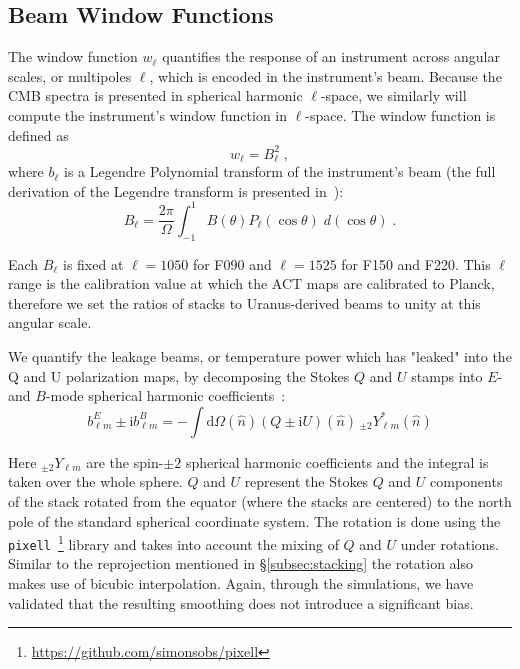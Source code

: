 \subsection{Beam Window Functions}
\label{subsec:window}

The window function $w_{\ell}$ quantifies the response of an instrument across angular scales, or multipoles $\ell$, which is encoded in the instrument's beam.  Because the CMB spectra is presented in spherical harmonic $\ell$-space, we similarly will compute the instrument's window function in $\ell$-space.  The window function is defined as
\begin{equation}
    w_\ell = B_\ell^2 \; ,
\end{equation}
where $b_\ell$ is a Legendre Polynomial transform of the instrument's beam (the full derivation of the Legendre transform is presented in~\cite{Lungu_2022}): 
\begin{equation}
B_{\ell} = \frac{2\pi}{\Omega}\int_{-1}^{1} B(\theta)P_{\ell}(\cos\theta)\; d(\cos\theta) \; .
\label{eq:legendre}
\end{equation}

Each $B_\ell$ is fixed at $\ell=1050$ for F090 and $\ell=1525$ for F150 and F220.  This $\ell$ range is the calibration value at which the ACT maps are calibrated to Planck, therefore we set the ratios of stacks to Uranus-derived beams to unity at this angular scale.

We quantify the leakage beams, or temperature power which has "leaked" into the Q and U polarization maps, by decomposing the Stokes $Q$ and $U$ stamps into $E$- and $B$-mode spherical harmonic coefficients~\cite{challinor_2000}:
\begin{equation}
\label{eq:pol_beam_coeffs}
b^{E}_{\ell m} \pm \mathrm{i} b^{B}_{\ell m} = - \int \mathrm{d}\Omega(\hat{n}) (Q \pm \mathrm{i} U)(\hat{n})\, {}_{\pm 2}Y^*_{\ell m}(\hat{n})
\end{equation}

Here ${}_{\pm 2}Y_{\ell m}$ are the spin-$\pm2$ spherical harmonic coefficients and the integral is taken over the whole sphere. $Q$ and $U$ represent the Stokes $Q$ and $U$ components of the stack rotated from the equator (where the stacks are centered) to the north pole of the standard spherical coordinate system. The rotation is done using the \texttt{pixell}~\footnote{\url{https://github.com/simonsobs/pixell}} library and takes into account the mixing of $Q$ and $U$ under rotations.  Similar to the reprojection mentioned in \S\ref{subsec:stacking} the rotation also makes use of bicubic interpolation. Again, through the simulations, we have validated that the resulting smoothing does not introduce a significant bias.

